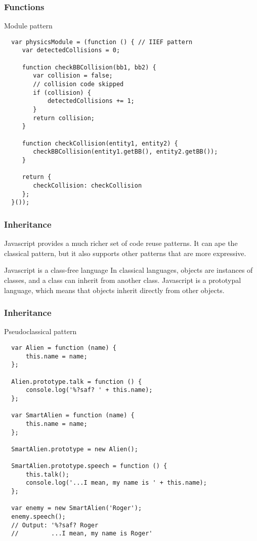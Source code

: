 \begin{frame}[fragile]
  \frametitle{Functions}
  \begin{block}{Module pattern}
  {\scriptsize
  \begin{verbatim}
  var physicsModule = (function () { // IIEF pattern
     var detectedCollisions = 0;

     function checkBBCollision(bb1, bb2) {
        var collision = false;
        // collision code skipped
        if (collision) {
            detectedCollisions += 1;
        }
        return collision;
     }

     function checkCollision(entity1, entity2) {
        checkBBCollision(entity1.getBB(), entity2.getBB());
     }

     return {
        checkCollision: checkCollision
     };
  }());
  \end{verbatim}
  }
  \end{block}
\end{frame}

\begin{frame}[fragile]
  \frametitle{Inheritance}

  Javascript provides a much richer set of code reuse patterns. It can ape the classical pattern, but it also supports other patterns that are more expressive.

  \pause

  \begin{block}{Javascript is a class-free language}
    In classical languages, objects are instances of classes, and a class can inherit from another class. Javascript is a prototypal language, which means that objects inherit directly from other objects.
  \end{block}
  
\end{frame}

\begin{frame}[fragile]
  \frametitle{Inheritance}

  \begin{block}{Pseudoclassical pattern}
  {\tiny
  \begin{verbatim}
  var Alien = function (name) {
      this.name = name;
  };

  Alien.prototype.talk = function () {
      console.log('%?saf? ' + this.name);
  };

  var SmartAlien = function (name) {
      this.name = name;
  };

  SmartAlien.prototype = new Alien();

  SmartAlien.prototype.speech = function () {
      this.talk();
      console.log('...I mean, my name is ' + this.name);
  };

  var enemy = new SmartAlien('Roger');
  enemy.speech(); 
  // Output: '%?saf? Roger
  //         ...I mean, my name is Roger'
  \end{verbatim}
  }
  \end{block}
\end{frame}

